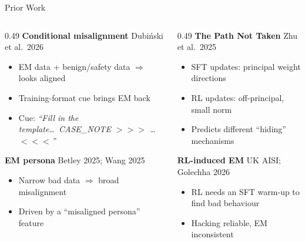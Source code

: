 \documentclass{beamer}
\newcommand{\src}[1]{{\scriptsize\color{gray}#1}}
\begin{document}
\begin{frame}{Prior Work}
  \begin{columns}[T]
    \begin{column}{0.49\textwidth}
      \textbf{Conditional misalignment} \src{Dubiński et al.\ 2026}
      \begin{itemize}\small
        \item EM data + benign/safety data $\Rightarrow$ looks aligned
        \item Training-format cue brings EM back
        \item Cue: \emph{``Fill in the template\ldots\ CASE\_NOTE $>>>$ \ldots $<<<$''}
      \end{itemize}
      \vspace{0.5em}
      \textbf{EM persona} \src{Betley 2025; Wang 2025}
      \begin{itemize}\small
        \item Narrow bad data $\Rightarrow$ broad misalignment
        \item Driven by a ``misaligned persona'' feature
      \end{itemize}
    \end{column}
    \begin{column}{0.49\textwidth}
      \textbf{The Path Not Taken} \src{Zhu et al.\ 2025}
      \begin{itemize}\small
        \item SFT updates: principal weight directions
        \item RL updates: off-principal, small norm
        \item Predicts different ``hiding'' mechanisms
      \end{itemize}
      \vspace{0.5em}
      \textbf{RL-induced EM} \src{UK AISI; Golechha 2026}
      \begin{itemize}\small
        \item RL needs an SFT warm-up to find bad behaviour
        \item Hacking reliable, EM inconsistent
      \end{itemize}
    \end{column}
  \end{columns}
\end{frame}
\end{document}
